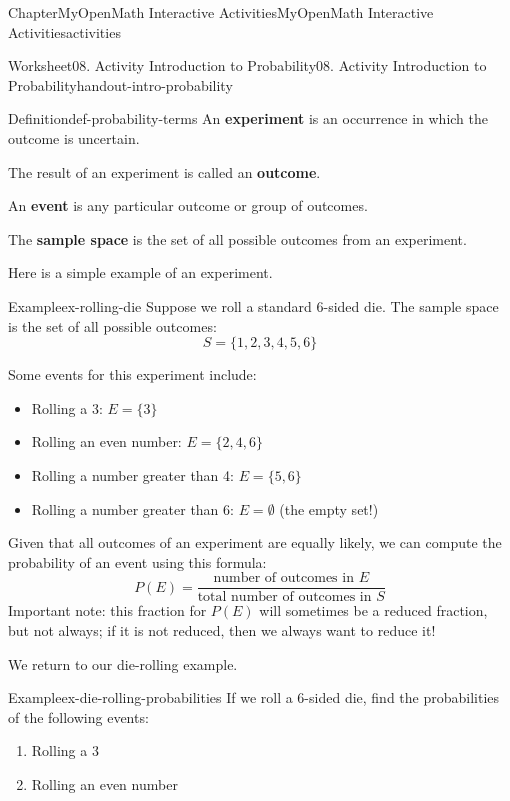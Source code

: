 \documentclass[oneside,10pt,]{book}
\newcommand{\ptxlistdisc}{\raisebox{0.3ex}{\textbullet}}
\newcommand{\terminology}[1]{\textbf{#1}}
\begin{document}
\begin{chapterptx}{Chapter}{MyOpenMath Interactive Activities}{}{MyOpenMath Interactive Activities}{}{}{activities}
\begin{worksheet-section}{Worksheet}{08. Activity Introduction to Probability}{}{08. Activity Introduction to Probability}{}{}{handout-intro-probability}
\begin{definition}{Definition}{}{def-probability-terms}%
 An \terminology{experiment} is an occurrence in which the outcome is uncertain.%
\par
{} The result of an experiment is called an \terminology{outcome}.%
\par
{} An \terminology{event} is any particular outcome or group of outcomes.%
\par
{} The \terminology{sample space} is the set of all possible outcomes from an experiment.%
\end{definition}
Here is a simple example of an experiment.%
\begin{example}{Example}{}{ex-rolling-die}%
Suppose we roll a standard 6-sided die. The sample space is the set of all possible outcomes:%
\begin{equation*}
S = \{1, 2, 3, 4, 5, 6\}
\end{equation*}
%
\par
Some events for this experiment include:%
\begin{itemize}[label=\ptxlistdisc]
\item{}Rolling a 3: \(E = \{3\}\)%
\item{}Rolling an even number: \(E = \{2, 4, 6\}\)%
\item{}Rolling a number greater than 4: \(E = \{5, 6\}\)%
\item{}Rolling a number greater than 6: \(E = \emptyset\) (the empty set!)%
\end{itemize}
%
\end{example}
Given that all outcomes of an experiment are equally likely, we can compute the probability of an event using this formula:%
\begin{equation*}
P(E) = \frac{\text{number of outcomes in } E}{\text{total number of outcomes in } S}
\end{equation*}
Important note: this fraction for \(P(E)\) will sometimes be a reduced fraction, but not always; if it is not reduced, then we always want to reduce it!%
\par
We return to our die-rolling example.%
\clearpage
\begin{example}{Example}{}{ex-die-rolling-probabilities}%
If we roll a 6-sided die, find the probabilities of the following events:%
\begin{enumerate}[label={\alph*}]
\item{}Rolling a 3%
\item{}Rolling an even number%

\end{enumerate}
\end{example}
\end{worksheet-section}
\end{chapterptx}
\end{document}
